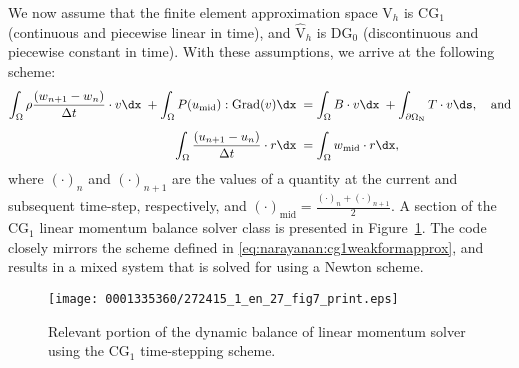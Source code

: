 We now assume that the finite element approximation space
$\mathrm{V}_{h}$ is CG$_{1}$ (continuous and piecewise linear in time),
and $\hat{\mathrm{V}}_{h}$ is DG$_{0}$ (discontinuous and piecewise
constant in time). With these assumptions, we arrive at the following
scheme:
\begin{equation}
  \begin{split}
    \int_{\Omega} \rho \frac{\left(\bw_{n+1} - \bw_{n}\right)}{\Delta
      t} \cdot \bv \dx\; + \int_{\Omega}
    \bP(\bu_{\mathrm{mid}}):\mathrm{Grad}(\bv) \dx\;
    &=  \int_{\Omega} \bB \cdot \bv \dx\;
    +  \int_{\partial\Omega_{\mathrm{N}}} \bT \cdot \bv \ds,
    \quad \mathrm{and}\\[4pt]
    \int_{\Omega} \frac{\left(\bu_{n+1} - \bu_{n}\right)}{\Delta t}
    \cdot \br \dx\;
    &=  \int_{\Omega} \bw_{\mathrm{mid}} \cdot \br \dx,
\end{split}
\label{eq:narayanan:cg1weakformapprox}
\end{equation}
where $(\cdot)_{n}$ and $(\cdot)_{n+1}$ are the values of a
quantity at the current and subsequent time-step, respectively, and
$(\cdot)_{\mathrm{mid}} = \frac{(\cdot)_{n} +
  (\cdot)_{n+1}}{2}$. A section of the CG$_{1}$ linear momentum balance
solver class is presented in Figure~\ref{code:narayanan:cg1}. The
code closely mirrors the scheme defined in
\eqref{eq:narayanan:cg1weakformapprox}, and results in a mixed system
that is solved for using a Newton scheme.

\begin{figure}[!t]
\texttt{[image: 0001335360/272415\_1\_en\_27\_fig7\_print.eps]}
\caption{Relevant portion of the dynamic balance of linear momentum
  solver using the CG$_{1}$ time-stepping scheme.}
\label{code:narayanan:cg1}
\end{figure}

